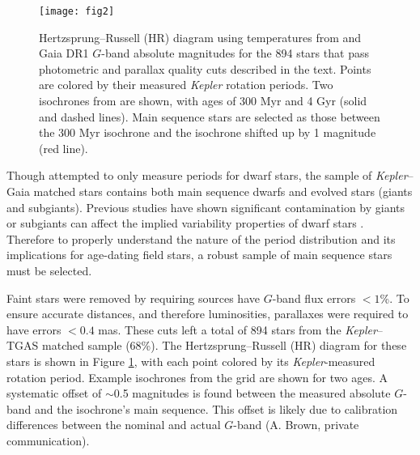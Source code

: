 \documentclass[manuscript, letterpaper]{aastex6}
\makeatletter
\let\origsection\section
\renewcommand\section{\@ifstar{\starsection}{\nostarsection}}
\newcommand\nostarsection[1]{\sectionprelude\origsection{#1}}
\newcommand\starsection[1]{\sectionprelude\origsection*{#1}}
\newcommand\sectionprelude{\vspace{1em}}
\newcommand{\Kepler}{\textsl{Kepler}\xspace}
\makeatother
\begin{document}
\begin{figure}[]
\centering
\texttt{[image: fig2]}
\caption{Hertzsprung--Russell (HR) diagram using temperatures from \citet{mcquillan2014} and Gaia DR1 $G$-band absolute magnitudes for the 894 stars that pass photometric and parallax quality cuts described in the text. Points are colored by their measured \Kepler rotation periods. Two isochrones from \citet{bressan2012} are shown, with ages of 300 Myr and 4 Gyr (solid and dashed lines). Main sequence stars are selected as those between the 300 Myr isochrone and the isochrone shifted up by 1 magnitude (red line).
}
\label{fig:HR}
\end{figure}

\section{Selecting Main Sequence Stars}

Though \citet{mcquillan2014} attempted to only measure periods for dwarf stars, the sample of \Kepler--Gaia matched stars contains both main sequence dwarfs and evolved stars (giants and subgiants). Previous studies have shown  significant contamination by giants or subgiants can affect the implied variability properties of dwarf stars \citep{ciardi2011,mann2012}. Therefore to properly understand the nature of the period distribution and its implications for age-dating field stars, a robust sample of main sequence stars must be selected.

Faint stars were removed by requiring sources have $G$-band flux errors $<1$\%. To ensure accurate distances, and therefore luminosities, parallaxes were required to have errors $<0.4$ mas. These cuts left a total of 894 stars from the \Kepler--TGAS matched sample (68\%). The Hertzsprung--Russell (HR) diagram for these stars is shown in Figure \ref{fig:HR}, with each point colored by its \Kepler-measured rotation period. Example isochrones from the \citet{bressan2012} grid are shown for two ages. A systematic offset of $\sim$0.5 magnitudes is found between the measured absolute $G$-band and the isochrone's main sequence. This offset is likely due to calibration differences between the nominal and actual $G$-band (A. Brown, private communication).
\end{document}

